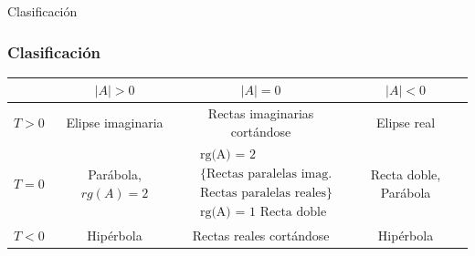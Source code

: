 \documentclass[xcolor={dvipsnames},aspectratio=169,10pt]{beamer}
\begin{document}
\begin{frame}{Clasificación}
  \frametitle{Clasificación}
  \begin{table}[]
    \begin{tabular}{|c|c|c|c|}
    \hline
    & $|A| > 0$ & $|A| = 0$ & $|A| < 0$ \\ \hline
    $T > 0$ & Elipse imaginaria & Rectas imaginarias cortándose & Elipse real \\ \hline
    $T = 0$ & Parábola, $rg(A) = 2$ & $\begin{aligned} &\text{rg(A) = 2} \\ &\{\text{Rectas paralelas imag.} \\ &\text{Rectas paralelas reales}\} \\ &\text{rg(A) = 1 Recta doble} \end{aligned}$ & Recta doble, Parábola \\ \hline
    $T < 0$ & Hipérbola & Rectas reales cortándose & Hipérbola \\ \hline
    \end{tabular}
  \end{table}
\end{frame}
\end{document}
